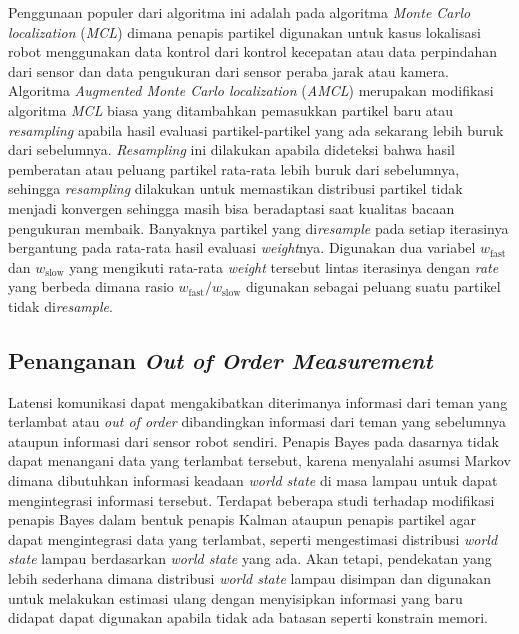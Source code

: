 Penggunaan populer dari algoritma ini adalah pada algoritma \textit{Monte Carlo localization} (\textit{MCL}) dimana penapis partikel digunakan untuk kasus lokalisasi robot menggunakan data kontrol dari kontrol kecepatan atau data perpindahan dari sensor dan data pengukuran dari sensor peraba jarak atau kamera. Algoritma \textit{Augmented Monte Carlo localization} (\textit{AMCL}) merupakan modifikasi algoritma \textit{MCL} biasa yang ditambahkan pemasukkan partikel baru atau \textit{resampling} apabila hasil evaluasi partikel-partikel yang ada sekarang lebih buruk dari sebelumnya. \textit{Resampling} ini dilakukan apabila dideteksi bahwa hasil pemberatan atau peluang partikel rata-rata lebih buruk dari sebelumnya, sehingga \textit{resampling} dilakukan untuk memastikan distribusi partikel tidak menjadi konvergen sehingga masih bisa beradaptasi saat kualitas bacaan pengukuran membaik. Banyaknya partikel yang di\textit{resample} pada setiap iterasinya bergantung pada rata-rata hasil evaluasi \textit{weight}nya. Digunakan dua variabel $w_{\text{fast}}$ dan $w_{\text{slow}}$ yang mengikuti rata-rata \textit{weight} tersebut lintas iterasinya dengan \textit{rate} yang berbeda dimana rasio $w_{\text{fast}} / w_{\text{slow}}$ digunakan sebagai peluang suatu partikel tidak di\textit{resample}.

\subsection{Penanganan \textit{Out of Order Measurement}}

Latensi komunikasi dapat mengakibatkan diterimanya informasi dari teman yang terlambat atau \textit{out of order} dibandingkan informasi dari teman yang sebelumnya ataupun informasi dari sensor robot sendiri. Penapis Bayes pada dasarnya tidak dapat menangani data yang terlambat tersebut, karena menyalahi asumsi Markov dimana dibutuhkan informasi keadaan \textit{world state} di masa lampau untuk dapat mengintegrasi informasi tersebut. Terdapat beberapa studi terhadap modifikasi penapis Bayes dalam bentuk penapis Kalman ataupun penapis partikel agar dapat mengintegrasi data yang terlambat, seperti mengestimasi distribusi \textit{world state} lampau berdasarkan \textit{world state} yang ada. Akan tetapi, pendekatan yang lebih sederhana dimana distribusi \textit{world state} lampau disimpan dan digunakan untuk melakukan estimasi ulang dengan menyisipkan informasi yang baru didapat dapat digunakan apabila tidak ada batasan seperti konstrain memori.

